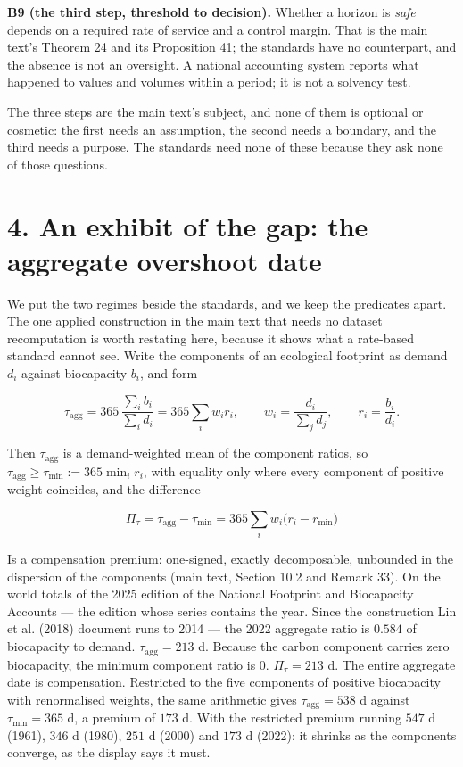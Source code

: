 \documentclass[11pt]{article}
\begin{document}
\textbf{B9 (the third step, threshold to decision).} Whether a horizon is \emph{safe} depends on a required rate of service and a control margin. That is the main text's Theorem 24 and its Proposition 41; the standards have no counterpart, and the absence is not an oversight. A national accounting system reports what happened to values and volumes within a period; it is not a solvency test.

The three steps are the main text's subject, and none of them is optional or cosmetic: the first needs an assumption, the second needs a boundary, and the third needs a purpose. The standards need none of these because they ask none of those questions.

\vspace{0.8em}

\section*{4. An exhibit of the gap: the aggregate overshoot date}\label{4-an-exhibit-of-the-gap-the-aggregate-overshoot-date}

We put the two regimes beside the standards, and we keep the predicates apart. The one applied construction in the main text that needs no dataset recomputation is worth restating here, because it shows what a rate-based standard cannot see. Write the components of an ecological footprint as demand \(d_i\) against biocapacity \(b_i\), and form

\[ \tau_{\mathrm{agg}}=365\,\frac{\sum_i b_i}{\sum_i d_i}=365\sum_i w_i r_i,\qquad w_i=\frac{d_i}{\sum_j d_j}, \qquad r_i=\frac{b_i}{d_i}. \]

Then \(\tau_{\mathrm{agg}}\) is a demand-weighted mean of the component ratios, so \(\tau_{\mathrm{agg}}\ge\tau_{\min}:=365\min_i r_i\), with equality only where every component of positive weight coincides, and the difference

\[ \Pi_\tau=\tau_{\mathrm{agg}}-\tau_{\min}=365\sum_i w_i\bigl(r_i-r_{\min}\bigr) \]

Is a compensation premium: one-signed, exactly decomposable, unbounded in the dispersion of the components (main text, Section 10.2 and Remark 33). On the world totals of the 2025 edition of the National Footprint and Biocapacity Accounts --- the edition whose series contains the year. Since the construction Lin et al. (2018) document runs to 2014 --- the 2022 aggregate ratio is \(0.584\) of biocapacity to demand. \(\tau_{\mathrm{agg}} = 213\) d. Because the carbon component carries zero biocapacity, the minimum component ratio is \(0\). \(\Pi_\tau = 213\) d. The entire aggregate date is compensation. Restricted to the five components of positive biocapacity with renormalised weights, the same arithmetic gives \(\tau_{\mathrm{agg}} = 538\) d against \(\tau_{\min} = 365\) d, a premium of \(173\) d. With the restricted premium running \(547\) d (1961), \(346\) d (1980), \(251\) d (2000) and \(173\) d (2022): it shrinks as the components converge, as the display says it must.
\end{document}
